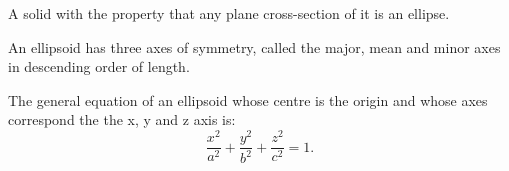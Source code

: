 
A solid with the property that any plane cross-section of it is an ellipse.
\par
An ellipsoid has three axes of symmetry, called the major, mean and minor axes in descending order of length.
\par
The general equation of an ellipsoid whose
centre is the origin and whose axes correspond the the x, y and z axis is:
\[ \frac{x^2}{a^2} + \frac{y^2}{b^2} + \frac{z^2}{c^2} = 1 . \]
  